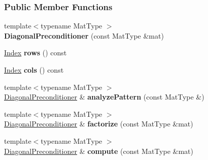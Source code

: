 \subsubsection*{Public Member Functions}
\begin{DoxyCompactItemize}
\item 
\mbox{\label{group___iterative_linear_solvers___module_ad7d67c2d25072f73543031e4853d443b}} 
{\footnotesize template$<$typename Mat\+Type $>$ }\\{\bfseries Diagonal\+Preconditioner} (const Mat\+Type \&mat)
\item 
\mbox{\label{group___iterative_linear_solvers___module_abfa8fc0d88fd77c131cf0bf8a88d8c4d}} 
\hyperlink{namespace_eigen_a62e77e0933482dafde8fe197d9a2cfde}{Index} {\bfseries rows} () const
\item 
\mbox{\label{group___iterative_linear_solvers___module_ab6e72d6ba6e848c2669e7453ccbf1e2b}} 
\hyperlink{namespace_eigen_a62e77e0933482dafde8fe197d9a2cfde}{Index} {\bfseries cols} () const
\item 
\mbox{\label{group___iterative_linear_solvers___module_af9a7205f04b0ef833b3fae8b2c3f6cc9}} 
{\footnotesize template$<$typename Mat\+Type $>$ }\\\hyperlink{group___iterative_linear_solvers___module_class_eigen_1_1_diagonal_preconditioner}{Diagonal\+Preconditioner} \& {\bfseries analyze\+Pattern} (const Mat\+Type \&)
\item 
\mbox{\label{group___iterative_linear_solvers___module_a3bb1bae9f49ff115fb21f951101fb88a}} 
{\footnotesize template$<$typename Mat\+Type $>$ }\\\hyperlink{group___iterative_linear_solvers___module_class_eigen_1_1_diagonal_preconditioner}{Diagonal\+Preconditioner} \& {\bfseries factorize} (const Mat\+Type \&mat)
\item 
\mbox{\label{group___iterative_linear_solvers___module_a4b938c483a6d17bfc079f2fde8671a08}} 
{\footnotesize template$<$typename Mat\+Type $>$ }\\\hyperlink{group___iterative_linear_solvers___module_class_eigen_1_1_diagonal_preconditioner}{Diagonal\+Preconditioner} \& {\bfseries compute} (const Mat\+Type \&mat)

\end{DoxyCompactItemize}
